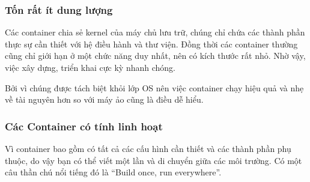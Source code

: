 \documentclass[14pt,a4paper]{book}
\begin{document}
			\subsubsection{Tốn rất ít dung lượng}
		\hspace{0.6cm}Các container chia sẻ kernel của máy chủ lưu trữ, chúng chỉ chứa các thành phần thực sự cần thiết với hệ điều hành và thư viện. Đồng thời các container thường cũng chỉ giới hạn ở một chức năng duy nhất, nên có kích thước rất nhỏ. Nhờ vậy, việc xây dựng, triển khai cực kỳ nhanh chóng.
		
		Bởi vì chúng được tách biệt khỏi lớp OS nên việc container chạy hiệu quả và nhẹ về tài nguyên hơn so với máy ảo cũng là điều dễ hiểu.
			\subsubsection{Các Container có tính linh hoạt}
		\hspace{0.6cm}Vì container bao gồm có tất cả các cấu hình cần thiết và các thành phần phụ thuộc, do vậy bạn có thể viết một lần và di chuyển giữa các môi trường. Có một câu thần chú nổi tiếng đó là “Build once, run everywhere”.\\
\end{document}
